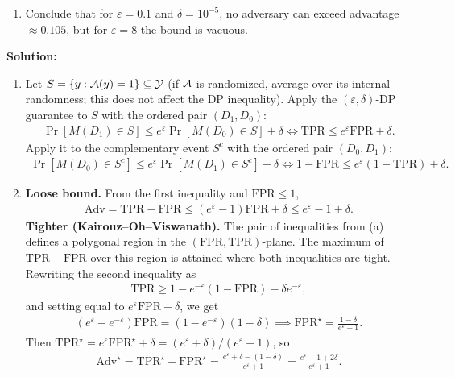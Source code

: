 \documentclass[12pt]{article}
\begin{document}
\begin{enumerate}
\begin{enumerate}
    \item Conclude that for $\varepsilon = 0.1$ and $\delta = 10^{-5}$, no adversary can exceed advantage $\approx 0.105$, but for $\varepsilon = 8$ the bound is vacuous.
\end{enumerate}

\begin{solution}
{\bf Solution:}\\
\begin{enumerate}
    \item Let $S = \{y : {\mathcal{A}}(y) = 1\} \subseteq {\mathcal{Y}}$ (if ${\mathcal{A}}$ is randomized, average over its internal randomness; this does not affect the DP inequality). Apply the $(\varepsilon, \delta)$-DP guarantee to $S$ with the ordered pair $(D_1, D_0)$:
    \begin{align*}
        \Pr[M(D_1) \in S] \le e^\varepsilon \Pr[M(D_0) \in S] + \delta \iff \mathrm{TPR} \le e^\varepsilon \mathrm{FPR} + \delta.
    \end{align*}
    Apply it to the complementary event $S^c$ with the ordered pair $(D_0, D_1)$:
    \begin{align*}
        \Pr[M(D_0) \in S^c] \le e^\varepsilon \Pr[M(D_1) \in S^c] + \delta \iff 1 - \mathrm{FPR} \le e^\varepsilon(1 - \mathrm{TPR}) + \delta.
    \end{align*}

    \item \textbf{Loose bound.} From the first inequality and $\mathrm{FPR} \le 1$,
    \begin{align*}
        \mathrm{Adv} = \mathrm{TPR} - \mathrm{FPR} \le (e^\varepsilon - 1)\mathrm{FPR} + \delta \le e^\varepsilon - 1 + \delta.
    \end{align*}
    \textbf{Tighter (Kairouz--Oh--Viswanath).} The pair of inequalities from (a) defines a polygonal region in the $(\mathrm{FPR}, \mathrm{TPR})$-plane. The maximum of $\mathrm{TPR} - \mathrm{FPR}$ over this region is attained where both inequalities are tight. Rewriting the second inequality as
    \begin{align*}
        \mathrm{TPR} \ge 1 - e^{-\varepsilon}(1 - \mathrm{FPR}) - \delta e^{-\varepsilon},
    \end{align*}
    and setting equal to $e^\varepsilon \mathrm{FPR} + \delta$, we get
    \begin{align*}
        (e^\varepsilon - e^{-\varepsilon})\mathrm{FPR} = (1 - e^{-\varepsilon})(1 - \delta) \implies \mathrm{FPR}^\star = \frac{1-\delta}{e^\varepsilon + 1}.
    \end{align*}
    Then $\mathrm{TPR}^\star = e^\varepsilon \mathrm{FPR}^\star + \delta = (e^\varepsilon + \delta)/(e^\varepsilon + 1)$, so
    \begin{align*}
        \mathrm{Adv}^\star = \mathrm{TPR}^\star - \mathrm{FPR}^\star = \frac{e^\varepsilon + \delta - (1 - \delta)}{e^\varepsilon + 1} = \frac{e^\varepsilon - 1 + 2\delta}{e^\varepsilon + 1}.
    \end{align*}


\end{enumerate}
\end{solution}
\end{enumerate}
\end{document}
